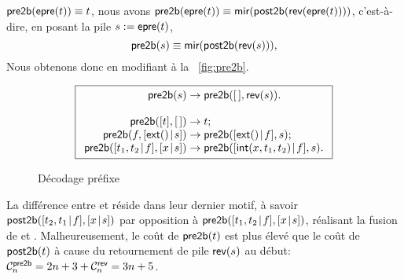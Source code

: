 \(\fun{pre2b}(\fun{epre}(t)) \equiv t\), nous avons
\(\fun{pre2b}(\fun{epre}(t)) \equiv
\fun{mir}(\fun{post2b}(\fun{rev}(\fun{epre}(t))))\), c'est-à-dire, en
posant la pile \(s := \fun{epre}(t)\),
\begin{equation*}
\abovedisplayskip=7pt
\belowdisplayskip=7pt
\fun{pre2b}(s) \equiv \fun{mir}(\fun{post2b}(\fun{rev}(s))),
\end{equation*}
Nous obtenons donc
 en modifiant
 à la
\fig~\vref{fig:pre2b}.
\begin{figure}[b]
\begin{equation*}
\boxed{
\begin{array}{r@{\;}c@{\;}l}
\fun{pre2b}(s) & \rightarrow & \fun{pre2b}(\el,\fun{rev}(s)).\\
\\
\fun{pre2b}([t],\el) & \rightarrow & t;\\
\fun{pre2b}(f,\cons{\fun{ext}()}{s}) & \rightarrow & \fun{pre2b}(\cons{\fun{ext}()}{f},s);\\
\fun{pre2b}(\cons{t_1,t_2}{f},\cons{x}{s}) & \rightarrow &
\fun{pre2b}(\cons{\fun{int}(x,t_1,t_2)}{f},s).
\end{array}}
\end{equation*}
\caption{Décodage préfixe\label{fig:pre2b}}
\end{figure}
La différence entre  et
 réside dans leur dernier
motif, à savoir \(\fun{post2b}(\cons{t_2,t_1}{f},\cons{x}{s})\) par
opposition à \(\fun{pre2b}(\cons{t_1,t_2}{f},\cons{x}{s})\), réalisant
la fusion de  et . Malheureusement, le coût
de \(\fun{pre2b}(t)\)  est plus élevé que
le coût de \(\fun{post2b}(t)\) à cause du retournement de pile
\(\fun{rev}(s)\) au début: \(\C{\fun{pre2b}}{n} = 2n + 3 +
\C{\fun{rev}}{n} = 3n +
5\).

